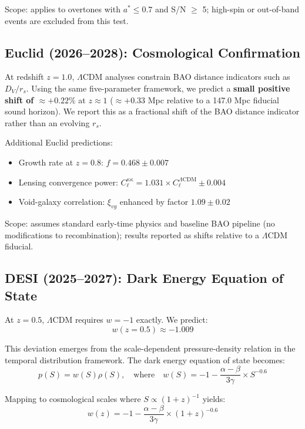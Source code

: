 \documentclass[aps,prd,preprint,onecolumn,nofootinbib,superscriptaddress,longbibliography]{revtex4-2}
\begin{document}
Scope: applies to overtones with $a^* \leq 0.7$ and S/N $\geq$ 5; high-spin or out-of-band events are excluded from this test.

\subsection{Euclid (2026--2028): Cosmological Confirmation}

At redshift $z = 1.0$, $\Lambda$CDM analyses constrain BAO distance indicators such as $D_V/r_s$. Using the same five-parameter framework, we predict a \textbf{small positive shift of $\approx +0.22\%$} at $z \approx 1$ ($\approx +0.33$ Mpc relative to a 147.0 Mpc fiducial sound horizon). We report this as a fractional shift of the BAO distance indicator rather than an evolving $r_s$.

Additional Euclid predictions:
\begin{itemize}
\item Growth rate at $z = 0.8$: $f = 0.468 \pm 0.007$
\item Lensing convergence power: $C_\ell^{\kappa\kappa} = 1.031 \times C_\ell^{\Lambda\text{CDM}} \pm 0.004$
\item Void-galaxy correlation: $\xi_{vg}$ enhanced by factor $1.09 \pm 0.02$
\end{itemize}

Scope: assumes standard early-time physics and baseline BAO pipeline (no modifications to recombination); results reported as shifts relative to a $\Lambda$CDM fiducial.

\subsection{DESI (2025--2027): Dark Energy Equation of State}

At $z = 0.5$, $\Lambda$CDM requires $w = -1$ exactly. We predict:
\begin{equation}
w(z=0.5) \approx -1.009
\end{equation}

This deviation emerges from the scale-dependent pressure-density relation in the temporal distribution framework. The dark energy equation of state becomes:
\begin{equation}
p(S) = w(S)\rho(S), \quad \text{where} \quad w(S) = -1 - \frac{\alpha-\beta}{3\gamma} \times S^{-0.6}
\end{equation}

Mapping to cosmological scales where $S \propto (1+z)^{-1}$ yields:
\begin{equation}
w(z) = -1 - \frac{\alpha-\beta}{3\gamma} \times (1+z)^{-0.6}
\end{equation}
\end{document}

